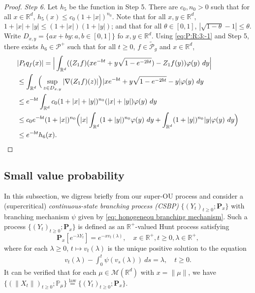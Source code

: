 \documentclass[12pt,a4paper]{amsart}
\theoremstyle{plain}
\theoremstyle{definition}
\numberwithin{equation}{section}
\begin{document}
\begin{proof}
  \emph{Step 6.}
  Let $h_5$ be the function in Step 5.
  There are $c_0, n_0> 0$ such that for all $x\in \mathbb R^d$, $h_5(x) \leq c_0(1+|x|)^{n_0}$.
  Note that for all $x, y \in \mathbb R^d$, $1+|x|+|y|\leq (1+|x|) (1+|y|)$; and that for all $\theta \in [0,1]$, $|\sqrt {1 - \theta} - 1| \leq \theta$.
  Write $D_{x,y} = \{ax+by: a, b \in [0,1]\}$ fo $x, y \in \mathbb R^d$.
  Using \eqref{eq:P:R:3:-1} and Step 5, there exists  $h_6 \in \mathcal P^+$ such that for all $t \geq 0$, $f \in \widetilde {\mathcal P}_g$ and $x \in \mathbb R^d$,
  \begin{align}
    & |P_t q_f(x)|
      = \Big| \int_{\mathbb R^d} ( (Z_1f)(x e^{-bt}+ y \sqrt{1 - e^{-2bt}}) - Z_1 f (y) ) \varphi(y) ~dy \Big| \\
    & \leq \int_{\mathbb R^d} \Big(\sup_{z\in D_{x,y}} |\nabla  (Z_1f) (z) |\Big) | x e^{-bt} + y \sqrt{1 - e^{-2bt}} - y | \varphi(y) ~dy \\
    & \leq e^{-bt} \int_{\mathbb R^d} c_0(1+|x|+|y|)^{n_0} (|x|+|y|) \varphi(y) ~dy \\
    & \leq c_0 e^{-bt}(1+|x|)^{n_0}\Big(|x|\int_{\mathbb R^d} (1+|y|)^{n_0}\varphi(y) ~dy + \int_{\mathbb R^d} (1+ |y|)^{n_0} |y| \varphi(y) ~dy \Big) \\
    & \leq e^{-bt} h_6(x).
      \qedhere
  \end{align}
\end{proof}

\subsection{Small value probability}
\label{sec: Small value probability}
In this subsection, we digress briefly from our super-OU process and consider a (supercritical) \emph{continuous-state branching process (CSBP)} $\{(Y_t)_{t\geq 0}; \mathbf P_x\}$ with branching mechanism $\psi$ given by \eqref{eq: honogeneou branching mechanism}.
Such a process $\{(Y_t)_{t\geq 0}; \mathbf P_x\}$ is defined as an $\mathbb R^+$-valued Hunt process satisfying
\[
  \mathbf P_x[e^{-\lambda Y_t}] = e^{- x v_t(\lambda)},
  \quad x\in \mathbb R^+, t\geq 0, \lambda \in \mathbb R^+,
\]
where for each $\lambda\geq 0$, $t\mapsto v_t(\lambda)$ is the unique positive solution to the equation
\begin{align}
  \label{eq: fkpp equation for CSBP}
  v_t(\lambda) - \int_0^t \psi(v_s(\lambda))~ds = \lambda,
  \quad t\geq 0.
\end{align}
It can be verified that for each $\mu \in \mathcal M(\mathbb R^d)$ with $x = \| \mu \|$, we have $ \{(\|X_t\|)_{t\geq 0}; \mathbb P_\mu\} \overset{\text{law}}{=} \{(Y_t)_{t\geq 0}; \mathbf P_x\}$.
\end{document}
